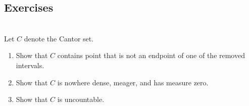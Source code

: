 \subsection{Exercises}

\begin{problem}\hfill\\
  Let $C$ denote the Cantor set.
\begin{enumerate}
  \item Show that $C$ contains point that is not an endpoint of one of the removed intervals.
  \item Show that $C$ is nowhere dense, meager, and has measure zero.
  \item Show that $C$ is uncountable.
\end{enumerate}
\end{problem}

